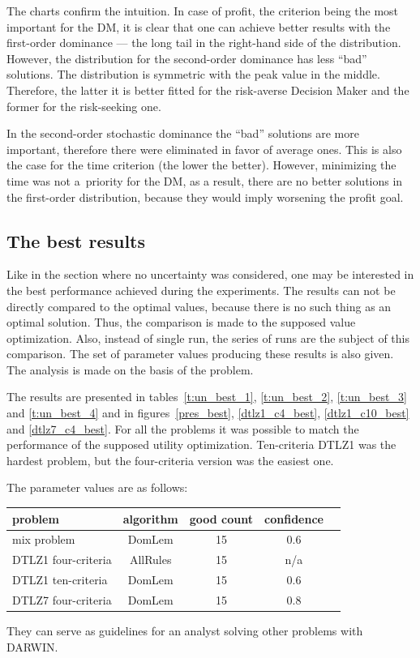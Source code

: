 The charts confirm the intuition. In case of profit, the criterion being the
most important for the DM, it is clear that one can achieve better results
with the first-order dominance --- the long tail in the right-hand side of the
distribution. However, the distribution for the second-order dominance has
less ``bad'' solutions. The distribution is symmetric with the peak value in
the middle. Therefore, the latter it is better fitted for the risk-averse
Decision Maker and the former for the risk-seeking one.

In the second-order stochastic dominance the ``bad'' solutions are more
important, therefore there were eliminated in favor of average ones. This is
also the case for the time criterion (the lower the better). However,
minimizing the time was not a~priority for the DM, as a result, there are no
better solutions in the first-order distribution, because they would imply
worsening the profit goal.

\clearpage{}
\subsection{The best results}

Like in the section where no uncertainty was considered, one may be interested
in the best performance achieved during the experiments. The results can not
be directly compared to the optimal values, because there is no such thing as
an optimal solution. Thus, the comparison is made to the supposed value
optimization. Also, instead of single run, the series of runs are the subject
of this comparison. The set of parameter values producing these results is
also given. The analysis is made on the basis of the problem.

The results are presented in tables~\ref{t:un_best_1}, \ref{t:un_best_2},
\ref{t:un_best_3} and \ref{t:un_best_4} and in figures~\ref{pres_best},
\ref{dtlz1_c4_best}, \ref{dtlz1_c10_best} and \ref{dtlz7_c4_best}. For all the
problems it was possible to match the performance of the supposed utility
optimization. Ten-criteria DTLZ1 was the hardest problem, but the
four-criteria version was the easiest one.

The parameter values are as follows:
\begin{center}
\begin{tabular}{l c c c c}
  \hline
  problem & algorithm & good count & confidence \\
  \hline
  mix problem & DomLem & 15 & 0.6 \\
  DTLZ1 four-criteria & AllRules & 15 & n/a \\
  DTLZ1 ten-criteria & DomLem & 15 & 0.6 \\
  DTLZ7 four-criteria & DomLem & 15 & 0.8 \\
  \hline
\end{tabular}
\end{center}
They can serve as guidelines for an analyst solving other problems with
DARWIN.

